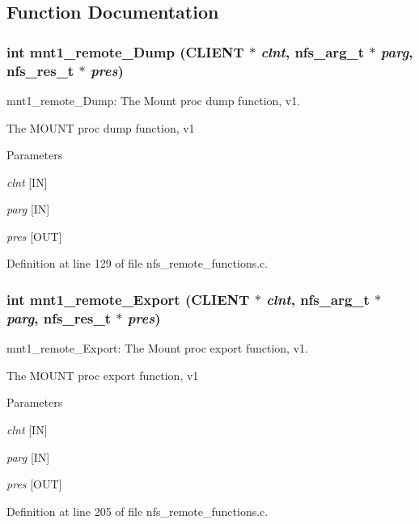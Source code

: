 \subsection{Function Documentation}
\subsubsection[{mnt1\_\-remote\_\-Dump}]{\setlength{\rightskip}{0pt plus 5cm}int mnt1\_\-remote\_\-Dump (CLIENT $\ast$ {\em clnt}, \/  nfs\_\-arg\_\-t $\ast$ {\em parg}, \/  nfs\_\-res\_\-t $\ast$ {\em pres})}\label{group__MNTprocs_ga3fb6c5e8cf31193ab707e76f17a10606}
mnt1\_\-remote\_\-Dump: The Mount proc dump function, v1.

The MOUNT proc dump function, v1


\begin{DoxyParams}{Parameters}
\item[{\em clnt}][IN] \item[{\em parg}][IN] \item[{\em pres}][OUT] \end{DoxyParams}


Definition at line 129 of file nfs\_\-remote\_\-functions.c.
\subsubsection[{mnt1\_\-remote\_\-Export}]{\setlength{\rightskip}{0pt plus 5cm}int mnt1\_\-remote\_\-Export (CLIENT $\ast$ {\em clnt}, \/  nfs\_\-arg\_\-t $\ast$ {\em parg}, \/  nfs\_\-res\_\-t $\ast$ {\em pres})}\label{group__MNTprocs_ga55294cc352b3688224a76aa914e4dad1}
mnt1\_\-remote\_\-Export: The Mount proc export function, v1.

The MOUNT proc export function, v1


\begin{DoxyParams}{Parameters}
\item[{\em clnt}][IN] \item[{\em parg}][IN] \item[{\em pres}][OUT] \end{DoxyParams}


Definition at line 205 of file nfs\_\-remote\_\-functions.c.
